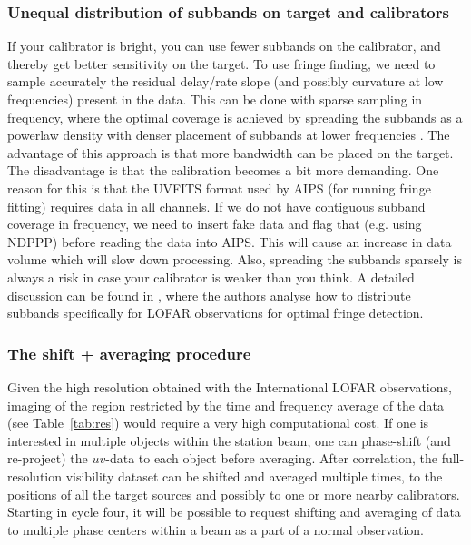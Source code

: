 \documentclass[graybox]{svmult}
\begin{document}
\subsubsection{Unequal distribution of subbands on target and calibrators} 
If your calibrator is bright, you can use fewer subbands on the calibrator, and
thereby get better sensitivity on the target. To use fringe finding, we need to
sample accurately the residual delay/rate slope (and possibly curvature at low
frequencies) present in the data. This can be done with sparse sampling in
frequency, where the optimal coverage is achieved by spreading the subbands as
a powerlaw density with denser placement of subbands at lower frequencies
\citep{marti-vidal10}. The advantage of this approach is that more bandwidth
can be placed on the target.  The disadvantage is that the calibration becomes
a bit more demanding. One reason for this is that the UVFITS format used by
AIPS (for running fringe fitting) requires data in all channels.  If we do not
have contiguous subband coverage in frequency, we need to insert fake data and
flag that (e.g. using NDPPP) before reading the data into AIPS.  This will
cause an increase in data volume which will slow down processing.  Also,
spreading the subbands sparsely is always a risk in case your calibrator is
weaker than you think. A detailed discussion can be found in
\cite{marti-vidal10}, where the authors analyse how to distribute subbands
specifically for LOFAR observations for optimal fringe detection.

\subsubsection{The shift + averaging procedure}\label{sec:shift}
Given the high resolution obtained with the
International LOFAR observations, imaging of the region restricted by the time
and frequency average of the data (see Table~\ref{tab:res}) would require a
very high computational cost. If one is interested in multiple objects within
the station beam, one can phase-shift (and re-project) the $uv$-data to each
object before averaging.  After correlation, the full-resolution visibility
dataset can be shifted and averaged multiple times, to the positions of all the
target sources and possibly to one or more nearby calibrators. Starting in
cycle four, it will be possible to request shifting and averaging of data to
multiple phase centers within a beam as a part of a normal observation.
\end{document}
